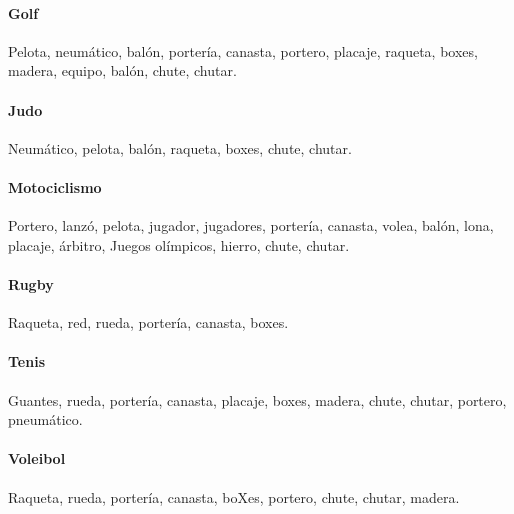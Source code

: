 \documentclass[../all.tex]{subfiles}
\begin{document}
    \paragraph{Golf}
    Pelota, neumático, balón, portería, canasta, portero, placaje, raqueta, boxes, madera, equipo, balón, chute, chutar.
    \paragraph{Judo}
    Neumático, pelota, balón, raqueta, boxes, chute, chutar.
    \paragraph{Motociclismo}
    Portero, lanzó, pelota, jugador, jugadores, portería, canasta, volea, balón, lona, placaje, árbitro, Juegos olímpicos, hierro, chute, chutar.
    \paragraph{Rugby}
    Raqueta, red, rueda, portería, canasta, boxes.
    \paragraph{Tenis}
    Guantes, rueda, portería, canasta, placaje, boxes, madera, chute, chutar, portero, pneumático.
    \paragraph{Voleibol}
    Raqueta, rueda, portería, canasta, boXes, portero, chute, chutar, madera.
\newpage
\end{document}
